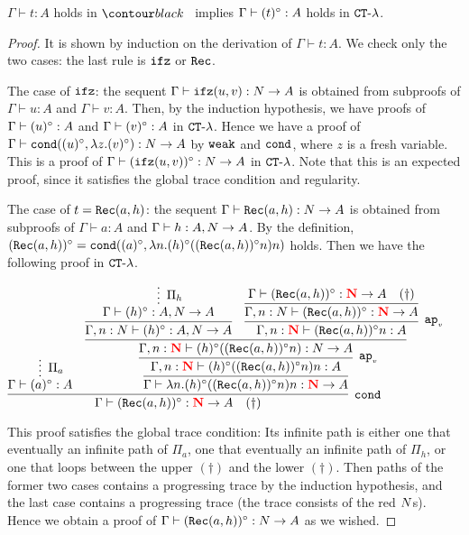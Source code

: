 \begin{proposition}\label{prop:TtoCTproof}
$\Gamma \vdash t:A$ holds in $\systemT$ implies $\Gamma\vdash (t)^\circ:A$ holds in ${ {\tt CT} \mbox{-} \lambda}$. 
\end{proposition}
\begin{proof}
  It is shown by induction on the derivation of $\Gamma \vdash t:A$.
  We check only the two cases: the last rule is ${\tt ifz}$ or ${\tt Rec}$.

  The case of ${\tt ifz}$:
  the sequent $\Gamma\vdash{\tt ifz}(u,v):{N}\to A$ is obtained from subproofs of
  $\Gamma\vdash u:A$ and $\Gamma\vdash v:A$. 
  Then, by the induction hypothesis, we have proofs of $\Gamma\vdash (u)^\circ:A$ and $\Gamma\vdash (v)^\circ:A$
  in ${ {\tt CT} \mbox{-} \lambda}$.
  Hence we have a proof of $\Gamma\vdash{\tt cond}((u)^\circ,\lambda z.(v)^\circ):{N}\to A$
  by ${\tt weak}$ and ${\tt cond}$, where $z$ is a fresh variable. 
  This is a proof of $\Gamma\vdash ({\tt ifz}(u,v))^\circ:{N}\to A$ in ${ {\tt CT} \mbox{-} \lambda}$.
  Note that this is an expected proof, since it satisfies the global trace condition and regularity. 

  The case of $t = {\tt Rec}(a,h)$: 
  the sequent $\Gamma\vdash{\tt Rec}(a,h):{N}\to A$ is obtained from subproofs of
  $\Gamma\vdash a:A$ and $\Gamma\vdash h:A,{N}\to A$.
  By the definition, $({\tt Rec}(a,h))^\circ = {\tt cond}((a)^\circ,\lambda n.(h)^\circ(({\tt Rec}(a,h))^\circ n)n)$ holds.
  Then we have the following proof in ${ {\tt CT} \mbox{-} \lambda}$. 
  \begin{center}\small
    $\infer[\cond]{
      \Gamma \vdash \TtoCT{\Rec(a,h)}:\redN\to A\quad(\dagger)
    }{
      \infer*[\Pi_a]{
        \Gamma \vdash \TtoCT{a}:A
      }{}
      &
      \infer{
        \Gamma \vdash \lambda n.\TtoCT{h}(\TtoCT{\Rec(a,h)}n)n:\redN\to A
      }{
        \infer[\apvar]{
          \Gamma,n:\redN \vdash \TtoCT{h}(\TtoCT{\Rec(a,h)}n)n: A
        }{
          \infer{
            \Gamma,n:\redN \vdash \TtoCT{h}(\TtoCT{\Rec(a,h)}n): \N\to A
          }{
            \infer{
              \Gamma,n:\N \vdash \TtoCT{h}: A,\N\to A
            }{
              \infer*[\Pi_h]{
                \Gamma \vdash \TtoCT{h}: A,\N\to A
              }{}
            }
            &
            \infer[\apvar]{
              \Gamma,n:\redN \vdash \TtoCT{\Rec(a,h)}n: A
            }{
              \infer{
                \Gamma,n:\N \vdash \TtoCT{\Rec(a,h)}: \redN\to A
              }{
                \Gamma \vdash \TtoCT{\Rec(a,h)}: \redN\to A\quad(\dagger)
              }
            }
          }
        }
      }
    }$
  \end{center}
  This proof satisfies the global trace condition:
  Its infinite path is either
  one that eventually an infinite path of $\Pi_a$,
  one that eventually an infinite path of $\Pi_h$, or 
  one that loops between the upper $(\dagger)$ and the lower $(\dagger)$. 
  Then paths of the former two cases contains a progressing trace by the induction hypothesis, and
  the last case contains a progressing trace (the trace consists of the red ${N}$s). 
  Hence we obtain a proof of $\Gamma \vdash ({\tt Rec}(a,h))^\circ:{N}\to A$ as we wished. 
\end{proof}

